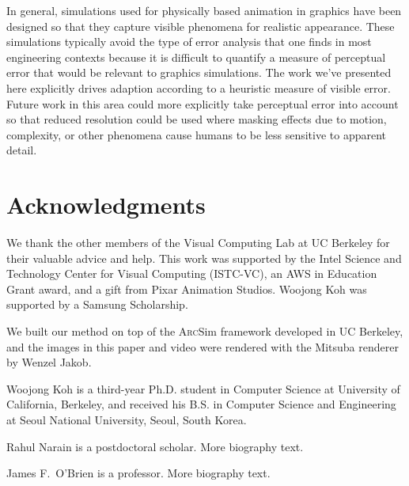 \documentclass[10pt,journal,compsoc,twoside]{TexInputs/IEEEtran}
\newcommand{\arcsim}{\textsc{Arc}Sim\xspace}
\begin{document}
\vspace{.1in}

In general, simulations used for physically based animation in
graphics have been designed so that they capture visible phenomena for
realistic appearance.  These simulations typically avoid the type of
error analysis that one finds in most engineering contexts because it
is difficult to quantify a measure of perceptual error that would be
relevant to graphics simulations.  The work we've presented here
explicitly drives adaption according to a heuristic measure of visible
error.  Future work in this area could more explicitly
take perceptual error into account so that reduced resolution could be
used where masking effects due to motion, complexity, or other
phenomena cause humans to be less sensitive to apparent detail.



\section*{Acknowledgments}
We thank the other members of the Visual Computing Lab at UC Berkeley for their
valuable advice and help. This work was supported by the Intel Science and Technology
Center for Visual Computing (ISTC-VC), an AWS in Education Grant
award, and a gift from Pixar Animation Studios.  Woojong Koh was supported by a
Samsung Scholarship.

We built our method on top of the \arcsim framework developed in UC Berkeley, and the
images in this paper and video were rendered with the Mitsuba renderer by Wenzel Jakob.

\vspace*{.1in}





\begin{IEEEbiography}
{Woojong Koh} is a third-year Ph.D. student in Computer Science at University of
California, Berkeley, and received his B.S. in Computer Science and Engineering at Seoul
National University, Seoul, South Korea.
\end{IEEEbiography}

\begin{IEEEbiography}
{Rahul Narain}
is a postdoctoral scholar. More biography text.
\end{IEEEbiography}

\begin{IEEEbiography}
{James F.~O'Brien}
is a professor. More biography text.
\end{IEEEbiography}

\vfill
\end{document}

